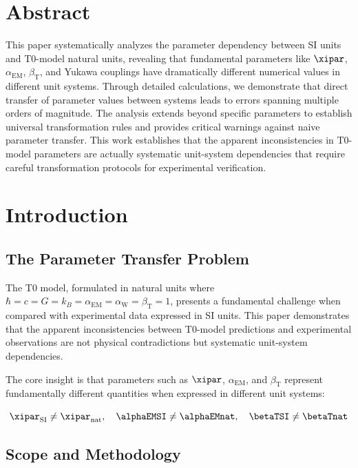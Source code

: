 \section*{Abstract}
		This paper systematically analyzes the parameter dependency between SI units and T0-model natural units, revealing that fundamental parameters like $\xipar$, $\alpha_{\text{EM}}$, $\beta_{\text{T}}$, and Yukawa couplings have dramatically different numerical values in different unit systems. Through detailed calculations, we demonstrate that direct transfer of parameter values between systems leads to errors spanning multiple orders of magnitude. The analysis extends beyond specific parameters to establish universal transformation rules and provides critical warnings against naive parameter transfer. This work establishes that the apparent inconsistencies in T0-model parameters are actually systematic unit-system dependencies that require careful transformation protocols for experimental verification.

	

	\section{Introduction}
	\label{sec:introduction}
	
	\subsection{The Parameter Transfer Problem}
	\label{subsec:parameter_problem}
	
	The T0 model, formulated in natural units where $\hbar = c = G = k_B = \alpha_{\text{EM}} = \alpha_{\text{W}} = \beta_{\text{T}} = 1$, presents a fundamental challenge when compared with experimental data expressed in SI units. This paper demonstrates that the apparent inconsistencies between T0-model predictions and experimental observations are not physical contradictions but systematic unit-system dependencies.
	
	The core insight is that parameters such as $\xipar$, $\alpha_{\text{EM}}$, and $\beta_{\text{T}}$ represent fundamentally different quantities when expressed in different unit systems:
	
	$$\xipar_{\text{SI}} \neq \xipar_{\text{nat}}, \quad \alphaEMSI \neq \alphaEMnat, \quad \betaTSI \neq \betaTnat$$
	
	\subsection{Scope and Methodology}
	\label{subsec:scope}
	
